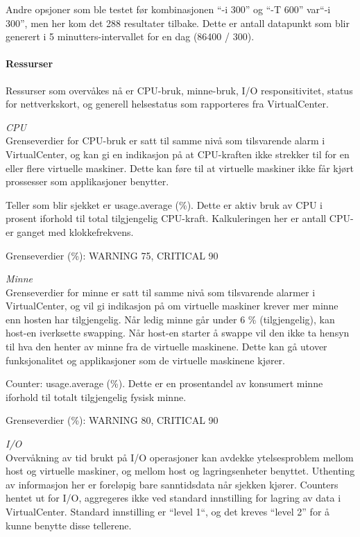 Andre opsjoner som ble testet før kombinasjonen ``-i 300'' og ``-T 600'' var``-i 300'', men her kom det 288 resultater tilbake. Dette er antall datapunkt som blir generert i 5 minutters-intervallet for en dag (86400 / 300).
\paragraph{Ressurser} \mbox\\

Ressurser som overvåkes nå er CPU-bruk, minne-bruk, I/O responsitivitet, status for nettverkskort, og generell helsestatus som rapporteres fra VirtualCenter.

\textit {CPU} \mbox{}\\
Grenseverdier for CPU-bruk er satt til samme nivå som tilsvarende alarm i VirtualCenter, og kan gi en indikasjon på at CPU-kraften ikke strekker til for en eller flere virtuelle maskiner. Dette kan føre til at virtuelle maskiner ikke får kjørt prossesser som applikasjoner benytter. \cite{vmwaremonitoring}

Teller som blir sjekket er usage.average (\%). Dette er aktiv bruk av CPU i prosent iforhold til total tilgjengelig CPU-kraft. Kalkuleringen her er antall CPU-er ganget med klokkefrekvens\cite{vmwarecpucounters}.

Grenseverdier (\%): WARNING 75, CRITICAL 90

\textit{Minne}  \mbox{}\\
Grenseverdier for minne er satt til samme nivå som tilsvarende alarmer i VirtualCenter, og vil gi indikasjon på om virtuelle maskiner krever mer minne enn hosten har tilgjengelig. Når ledig minne går under 6 \% (tilgjengelig), kan host-en iverksette swapping. Når host-en starter å swappe vil den ikke ta hensyn til hva den henter av minne fra de virtuelle maskinene. Dette kan gå utover funksjonalitet og applikasjoner som de virtuelle maskinene kjører.

Counter: usage.average (\%). Dette er en prosentandel av konsumert minne iforhold til totalt tilgjengelig fysisk minne\cite{vmwarememcounters}.

Grenseverdier (\%): WARNING 80, CRITICAL 90

\textit{I/O}  \mbox{}\\
Overvåkning av tid brukt på I/O operasjoner kan avdekke ytelsesproblem mellom host og virtuelle maskiner, og mellom host og lagringsenheter benyttet. Uthenting av informasjon her er foreløpig bare sanntidsdata når sjekken kjører. Counters hentet ut for I/O, aggregeres ikke ved standard innstilling for lagring av data i VirtualCenter. Standard innstilling er ``level 1``, og det kreves ``level 2'' for å kunne benytte disse tellerene\cite{vmwaredatalevels}. 

